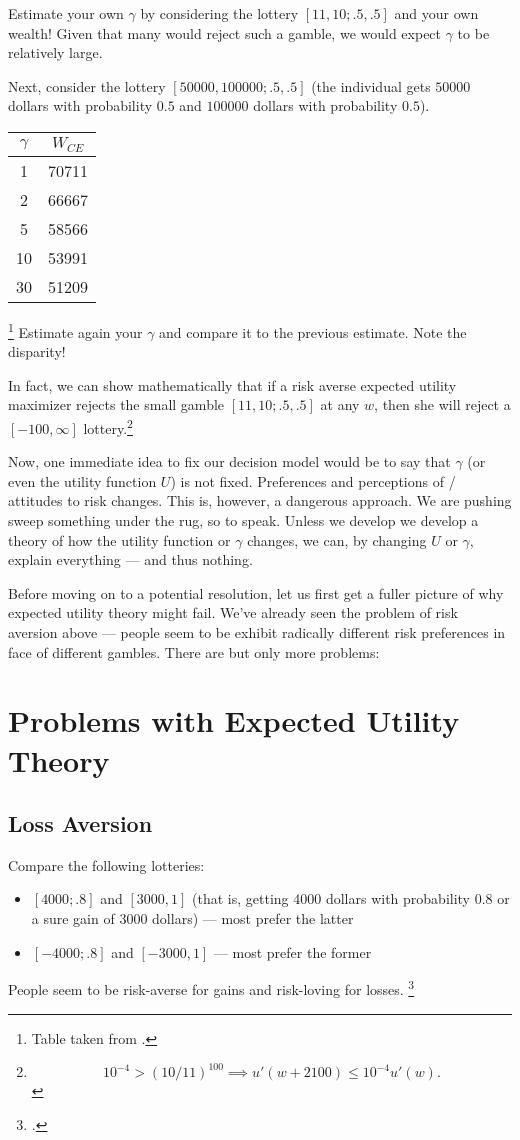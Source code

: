 \documentclass[oneside,reqno,letterpaper]{amsart}
\begin{document}
Estimate your own \(\gamma\) by considering the lottery \([11, 10; .5, .5]\) and your own wealth!
Given that many would reject such a gamble, we would expect \(\gamma\) to be relatively large.


Next, consider the lottery \([50000, 100000; .5, .5]\) (the individual gets \(50000\) dollars with probability \(0.5\) and \(100000\) dollars with probability \(0.5\)).

\begin{tabular}{ c c } 
  \(\gamma\) & \(W_{CE}\) \\ 
\hline
  1 & \num{70711} \\ 
  2 & \num{66667} \\ 
  5 & \num{58566} \\ 
  10 & \num{53991} \\ 
  30 & \num{51209} \\ 
\end{tabular}\footnote{Table taken from \textcite{Schilbach2020Lecture}. }
Estimate again your \(\gamma\) and compare it to the previous estimate.
Note the disparity!

In fact, we can show mathematically that if a risk averse expected utility maximizer rejects the small gamble \([11, 10; .5, .5]\) at any \(w\), then she will reject a \([-100, \infty]\) lottery.\footnote{
\[
  10^{-4} > (10 / 11)^{100} \implies u'(w + 2100) \leq 10^{-4} u'(w) . 
\] 
}

Now, one immediate idea to fix our decision model would be to say that \(\gamma\) (or even the utility function \(U\)) is not fixed.
Preferences and perceptions of / attitudes to risk changes.
This is, however, a dangerous approach.
We are pushing sweep something under the rug, so to speak.
Unless we develop we develop a theory of how the utility function or \(\gamma\) changes, we can, by changing \(U\) or \(\gamma\), explain everything --- and thus nothing.

Before moving on to a potential resolution, let us first get a fuller picture of why expected utility theory might fail.
We've already seen the problem of risk aversion above --- people seem to be exhibit radically different risk preferences in face of different gambles.
There are but only more problems:


\section{Problems with Expected Utility Theory}
\subsection{Loss Aversion}
Compare the following lotteries:
\begin{itemize}
  \item \([4000; .8]\) and \([3000, 1]\) (that is, getting \(4000\) dollars with probability \(0.8\) or a sure gain of \(3000\) dollars) --- most prefer the latter
  \item \([-4000; .8]\) and \([-3000, 1]\) --- most prefer the former
\end{itemize}
People seem to be risk-averse for gains and risk-loving for losses.
\footnote{\Textcite{Schilbach2020Lecture}. }
\end{document}
